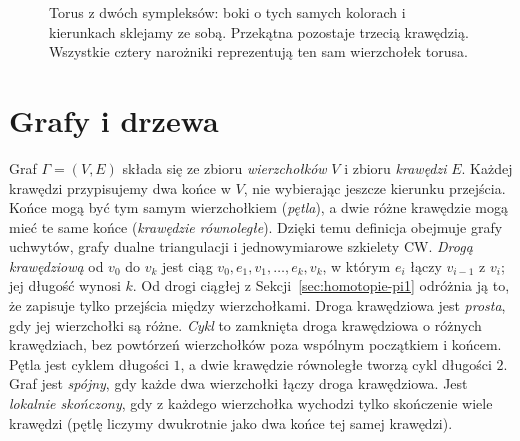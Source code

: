 \begin{figure}[!htbp]
\centering
{}
\caption{Torus z dwóch sympleksów: boki o tych samych
kolorach i kierunkach sklejamy ze sobą. Przekątna
pozostaje trzecią krawędzią. Wszystkie cztery narożniki
reprezentują ten sam wierzchołek torusa.}
\label{fig:delta-torus}
\end{figure}

\section{Grafy i drzewa}
\label{sec:grafy-drzewa}

Graf $\Gamma=(V,E)$ składa się ze zbioru \emph{wierzchołków}
$V$ i zbioru \emph{krawędzi} $E$. Każdej krawędzi przypisujemy
dwa końce w $V$, nie wybierając jeszcze kierunku przejścia.
Końce mogą być tym samym wierzchołkiem (\emph{pętla}), a dwie
różne krawędzie mogą mieć te same końce (\emph{krawędzie
równoległe}). Dzięki temu definicja obejmuje grafy uchwytów,
grafy dualne triangulacji i jednowymiarowe szkielety CW.
\emph{Drogą krawędziową} od $v_0$ do $v_k$ jest ciąg
$v_0,e_1,v_1,\ldots,e_k,v_k$, w którym $e_i$ łączy
$v_{i-1}$ z $v_i$; jej długość wynosi $k$.
Od drogi ciągłej z Sekcji~\ref{sec:homotopie-pi1} odróżnia ją
to, że zapisuje tylko przejścia między wierzchołkami.
Droga krawędziowa jest \emph{prosta}, gdy jej wierzchołki
są różne. \emph{Cykl} to zamknięta droga krawędziowa
o różnych krawędziach, bez powtórzeń wierzchołków poza
wspólnym początkiem i końcem. Pętla jest cyklem długości
$1$, a dwie krawędzie równoległe tworzą cykl długości $2$.
Graf jest \emph{spójny}, gdy każde dwa wierzchołki
łączy droga krawędziowa.
Jest \emph{lokalnie skończony}, gdy z każdego wierzchołka
wychodzi tylko skończenie wiele krawędzi (pętlę liczymy
dwukrotnie jako dwa końce tej samej krawędzi).

